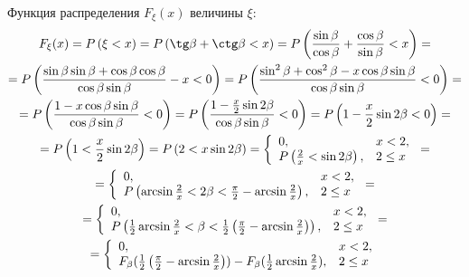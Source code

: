 \documentclass[12pt,a4paper]{article}
\begin{document}
    Функция распределения $F_\xi(x)$ величины $\xi$:
    \begin{multline}
        F_\xi(x)
        = \probability{\xi < x}
        = \probability{\tg \beta + \ctg \beta < x}
        = \probability{\frac{\sin \beta}{\cos \beta} + \frac{\cos \beta}{\sin \beta} < x} = \\
        = \probability{\frac{\sin \beta \sin \beta + \cos \beta \cos \beta}{\cos \beta \sin \beta} - x < 0}
        = \probability{\frac{\sin^2 \beta + \cos^2 \beta - x \cos \beta \sin \beta}{\cos \beta \sin \beta} < 0} = \\
        = \probability{\frac{1 - x \cos \beta \sin \beta}{\cos \beta \sin \beta} < 0}
        = \probability{\frac{1 - \frac{x}{2} \sin 2 \beta}{\cos \beta \sin \beta} < 0}
        = \probability{1 - \frac{x}{2} \sin 2 \beta < 0} = \\
        = \probability{1 < \frac{x}{2} \sin 2 \beta}
        = \probability{2 < x \sin 2 \beta}
        = \left \{
        \begin{array}{ll}
            0,                                        & x < 2 , \\
            \probability{\frac{2}{x} < \sin 2 \beta}, & 2 \le x
        \end{array}
        \right . = \\
        = \left \{
        \begin{array}{ll}
            0,                                                                                 & x < 2 , \\
            \probability{\arcsin \frac{2}{x} < 2 \beta < \frac{\pi}{2} - \arcsin \frac{2}{x}}, & 2 \le x
        \end{array}
        \right . = \\
        = \left \{
        \begin{array}{ll}
            0,                                                                                                                        & x < 2 , \\
            \probability{\frac{1}{2} \arcsin \frac{2}{x} < \beta < \frac{1}{2} \left ( \frac{\pi}{2} - \arcsin \frac{2}{x} \right )}, & 2 \le x
        \end{array}
        \right . = \\
        = \left \{
        \begin{array}{ll}
            0,                                                                                                                    & x < 2 , \\
            F_\beta(\frac{1}{2} \left ( \frac{\pi}{2} - \arcsin \frac{2}{x} \right )) - F_\beta(\frac{1}{2} \arcsin \frac{2}{x}), & 2 \le x
        \end{array}
        \right .
    \end{multline}
\end{document}
